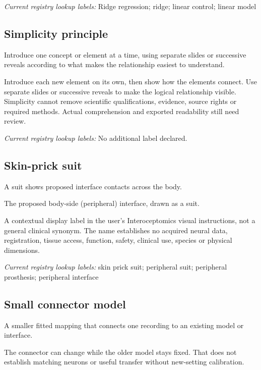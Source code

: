 \noindent\textit{Current registry lookup labels:} Ridge regression; ridge; linear control; linear model\par

\begin{samepage}
\subsection*{Simplicity principle}
\noindent Introduce one concept or element at a time, using separate slides or successive reveals according to what makes the relationship easiest to understand.\par
\end{samepage}
\noindent Introduce each new element on its own, then show how the elements connect. Use separate slides or successive reveals to make the logical relationship visible. Simplicity cannot remove scientific qualifications, evidence, source rights or required methods. Actual comprehension and exported readability still need review.\par


\noindent\textit{Current registry lookup labels:} No additional label declared.\par

\subsection*{Skin-prick suit}
\noindent A suit shows proposed interface contacts across the body.\par
\noindent The proposed body-side (peripheral) interface, drawn as a suit.\par
\noindent A contextual display label in the user's Interoceptomics visual instructions, not a general clinical synonym. The name establishes no acquired neural data, registration, tissue access, function, safety, clinical use, species or physical dimensions.\par

\noindent\textit{Current registry lookup labels:} skin prick suit; peripheral suit; peripheral prosthesis; peripheral interface\par

\begin{samepage}
\subsection*{Small connector model}
\noindent A smaller fitted mapping that connects one recording to an existing model or interface.\par
\end{samepage}
\begin{samepage}
\noindent The connector can change while the older model stays fixed. That does not establish matching neurons or useful transfer without new-setting calibration.\par\nopagebreak[4]

\end{samepage}


